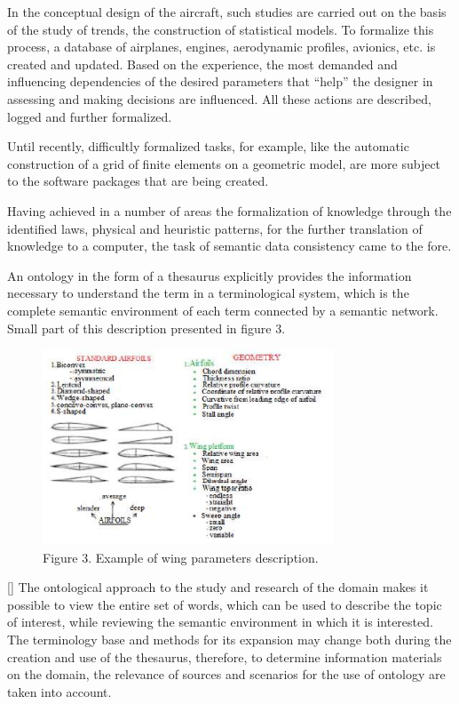 \documentclass[8pt,twocolumn]{article}
\begin{document}
In the conceptual design of the aircraft, such studies are carried out on the basis of the study of trends, the construction of statistical models. To formalize this process, a database of airplanes, engines, aerodynamic profiles, avionics, etc. is created and updated. Based on the experience, the most demanded and influencing dependencies of the desired parameters that “help” the designer in assessing and making decisions are influenced. All these actions are described, logged and further formalized.

Until recently, difficultly formalized tasks, for example, like the automatic construction of a grid of finite elements on a geometric model, are more subject to the software packages that are being created. 

Having achieved in a number of areas the formalization of knowledge through the identified laws, physical and heuristic patterns, for the further translation of knowledge to a computer, the task of semantic data consistency came to the fore.

An ontology in the form of a thesaurus explicitly provides the information necessary to understand the term in a terminological system, which is the complete semantic environment of each term connected by a semantic network. Small part of this description presented in figure 3.
\begin{figure}[h]
    \centering
    \includegraphics[scale=0.7]{Figure3.png}
    \caption{Figure 3. Example of wing parameters description.}
    \label{Fig3:image}
\end{figure}[]
The ontological approach to the study and research of the domain makes it possible to view the entire set of words, which can be used to describe the topic of interest, while reviewing the semantic environment in which it is interested. The terminology base and methods for its expansion may change both during the creation and use of the thesaurus, therefore, to determine information materials on the domain, the relevance of sources and scenarios for the use of ontology are taken into account.
\end{document}
